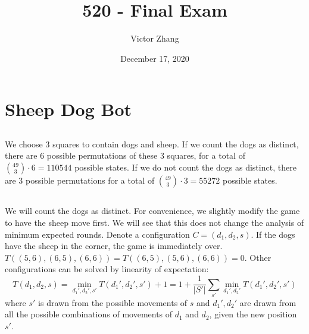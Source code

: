 \documentclass{article}
\title{520 - Final Exam}
\author{Victor Zhang}
\date{December 17, 2020}
\begin{document}
\maketitle

\section{Sheep Dog Bot}
\subsection{}
We choose 3 squares to contain dogs and sheep. If we count the dogs as distinct, there are 6 possible permutations of these 3 squares, for a total of $\binom{49}{3}\cdot 6 = 110544$ possible states. If we do not count the dogs as distinct, there are 3 possible permutations for a total of $\binom{49}{3} \cdot 3 = 55272$ possible states.

\subsection{}
We will count the dogs as distinct. For convenience, we slightly modify the game to have the sheep move first. We will see that this does not change the analysis of minimum expected rounds. Denote a configuration $C = (d_1, d_2, s)$. If the dogs have the sheep in the corner, the game is immediately over. $T((5,6),(6,5),(6,6)) = T((6,5),(5,6),(6,6)) = 0$. Other configurations can be solved by linearity of expectation:
$$T(d_1,d_2,s) = \min_{d_1',d_2',s'} T(d_1', d_2', s') + 1 = 1 + \frac{1}{|S'|} \sum_{s'} \min_{d_1',d_2'} T(d_1',d_2',s') $$
where $s'$ is drawn from the possible movements of $s$ and $d_1',d_2'$ are drawn from all the possible combinations of movements of $d_1$ and $d_2$, given the new position $s'$.
\end{document}
